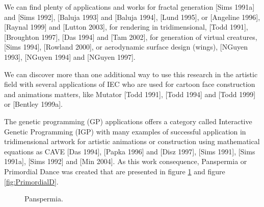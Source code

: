 We can find plenty of applications and works for fractal generation [Sims 1991a]
and \cite{sims1992interactive}[Sims 1992], \cite{baluja1993simulating}[Baluja
1993] and \cite{baluja1994towards}[Baluja 1994], \cite{lund1995artistic}[Lund
1995], or \cite{angeline1996evolving}[Angeline
1996],\cite{raynal1999manipulation}[Raynal 1999] and
\cite{lutton2003artie}[Lutton 2003], for rendering in tridimensional,
\cite{todd1992artificial}[Todd 1991],\cite{broughton1997use}[Broughton 1997],
\cite{das1994genetic}[Das 1994] and \cite{tam2002genetic}[Tam 2002], for
generation of virtual creatures, \cite{}[Sims 1994],
\cite{rowland2000evolutionary}[Rowland 2000], or aerodynamic surface design
(wings), \cite{nguyen1993evolvable}[NGuyen 1993],
\cite{nguyen1994evolvable}[NGuyen 1994] and \cite{}[NGuyen 1997].

We can discover more than one additional way to use this research in the
artistic field with several applications of IEC who are used for cartoon face
construction and animations matters, like Mutator \cite{}[Todd 1991], \cite{todd1994evolutionary}[Todd 1994]
and \cite{todd1999mutation}[Todd 1999] or \cite{bentley1999introduction}[Bentley 1999a].

The genetic programming (GP) applications offers a category called Interactive
Genetic Programming (IGP) with many examples of successful application in
tridimensional artwork for artistic animations or construction using
mathematical equations as CAVE \cite{das1994genetic}[Das 1994],
\cite{papka1996ubiworld}[Papka 1996] and \cite{disz1997ubiworld}[Disz 1997],
\cite{}[Sims 1991], \cite{sims1991artificial}[Sims 1991a],
\cite{sims1992interactive}[Sims 1992] and \cite{min2004creative}[Min 2004]. As
this work consequence, Panspermia or Primordial Dance was created that are
presented in figure \ref{fig:Panspermia} and figure \ref{fig:PrimordialD}.

\begin{figure}
\captionsetup{justification=centering,margin=2cm}
\centering
\setlength\fboxsep{0pt}
\setlength\fboxrule{0.7pt}
\caption{Panspermia.}
\label{fig:Panspermia}       
\end{figure}

